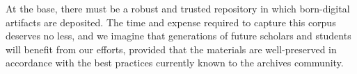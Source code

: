 At the base, there  must be a robust and trusted repository in which born-digital artifacts are deposited. The time and expense required to capture this corpus deserves no less, and we imagine that generations of future scholars and students will benefit from our efforts, provided that the materials are well-preserved in accordance with the best practices currently known to the archives community. 

